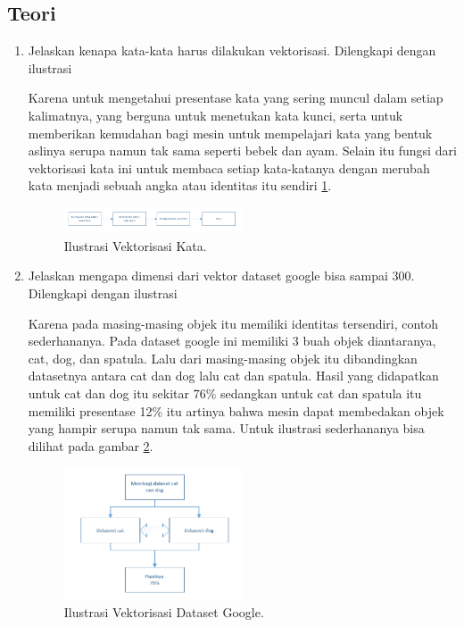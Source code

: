 \subsection{Teori}
\begin{enumerate}
\item Jelaskan kenapa kata-kata harus dilakukan vektorisasi. Dilengkapi dengan ilustrasi \par
Karena untuk mengetahui presentase kata yang sering muncul dalam setiap kalimatnya, yang berguna untuk menetukan kata kunci, serta untuk memberikan kemudahan bagi mesin untuk mempelajari kata yang bentuk aslinya serupa namun tak sama seperti bebek dan ayam. Selain itu fungsi dari vektorisasi kata ini untuk membaca setiap kata-katanya dengan merubah kata menjadi sebuah angka atau identitas itu sendiri \ref{vek1}.
		\begin{figure}[ht]
		\centerline{\includegraphics[width=0.5\textwidth]{figures/im/vek1.png}}
		\caption{Ilustrasi Vektorisasi Kata.}
		\label{vek1}
		\end{figure}

\item Jelaskan mengapa dimensi dari vektor dataset google bisa sampai 300. Dilengkapi dengan ilustrasi \par
Karena pada masing-masing objek itu memiliki identitas tersendiri, contoh sederhananya. Pada dataset google ini memiliki 3 buah objek diantaranya, cat, dog, dan spatula. Lalu dari masing-masing objek itu dibandingkan datasetnya antara cat dan dog lalu cat dan spatula. Hasil yang didapatkan untuk cat dan dog itu sekitar 76\% sedangkan untuk cat dan spatula itu memiliki presentase 12\% itu artinya bahwa mesin dapat membedakan objek yang hampir serupa namun tak sama. Untuk ilustrasi sederhananya bisa dilihat pada gambar \ref{vek2}.
		\begin{figure}[ht]
		\centerline{\includegraphics[width=0.5\textwidth]{figures/im/vek2.png}}
		\caption{Ilustrasi Vektorisasi Dataset Google.}
		\label{vek2}
		\end{figure}


\end{enumerate}
